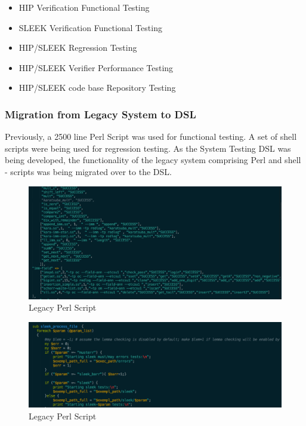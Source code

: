 \begin{itemize}
\item HIP Verification Functional Testing
\item SLEEK Verification Functional Testing
\item HIP/SLEEK Regression Testing
\item HIP/SLEEK Verifier Performance Testing
\item HIP/SLEEK code base Repository Testing 
\end{itemize}

\subsubsection{Migration from Legacy System to DSL}

Previously, a 2500 line Perl Script was used for functional testing. A set of shell scripts were being used for regression testing. As the System Testing DSL was being developed, the functionality of the legacy system comprising Perl and shell - scripts was being migrated over to the DSL. 

\begin{figure}[H]
  \centering
    \includegraphics[width=500px]{figures/legacy1.png}
  \caption{Legacy Perl Script}
\end{figure}

\begin{figure}[H]
  \centering
    \includegraphics[width=500px]{figures/legacy2.png}
  \caption{Legacy Perl Script}
\end{figure}

